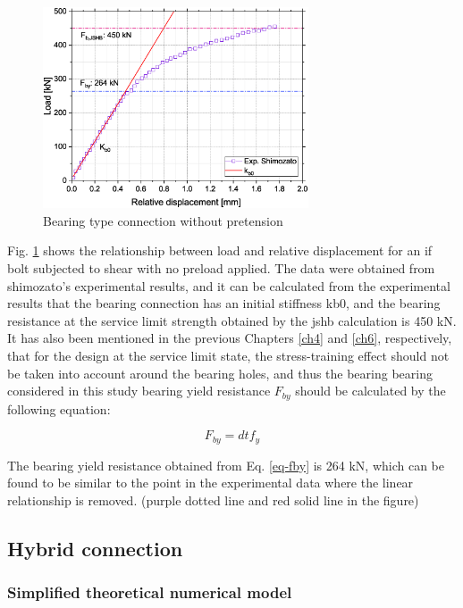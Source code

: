 \begin{figure}[htbp]
    \centering
    \includegraphics[width=0.7\textwidth]{imgs/ch7/onebbolt.eps}
    \caption{Bearing type connection without pretension}
    \label{fig-onebbolt}
\end{figure}

Fig. \ref{fig-onebbolt} shows the relationship between load and relative displacement for an if bolt subjected to shear with no preload applied. The data were obtained from shimozato's \cite{Shimozato2008ExperrimentalModel} experimental results, and it can be calculated from the experimental results that the bearing connection has an initial stiffness kb0, and the bearing resistance at the service limit strength obtained by the jshb calculation is 450 kN. It has also been mentioned in the previous Chapters \ref{ch4} and \ref{ch6}, respectively, that for the design at the service limit state, the stress-training effect should not be taken into account around the bearing holes, and thus the bearing bearing considered in this study bearing yield resistance $F_{by}$ should be calculated by the following equation:

\begin{equation} \label{eq-fby}
    F_{by} = dtf_y
\end{equation}

The bearing yield resistance obtained from Eq. \ref{eq-fby} is 264 kN, which can be found to be similar to the point in the experimental data where the linear relationship is removed. (purple dotted line and red solid line in the figure)

\subsection{Hybrid connection}

\subsubsection{Simplified theoretical numerical model}

